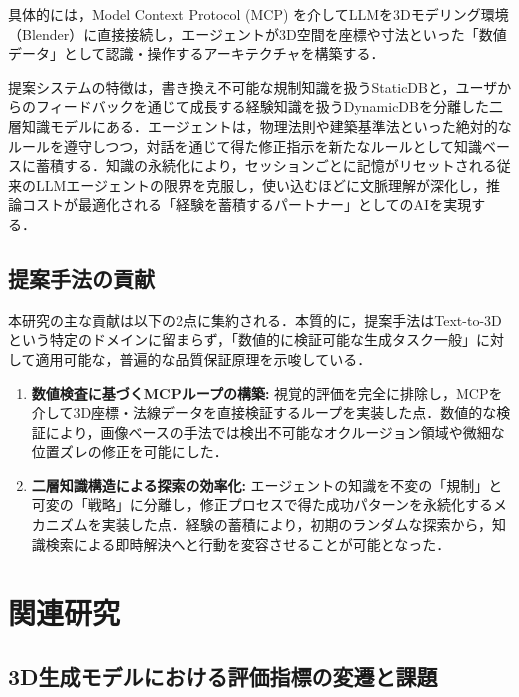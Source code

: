 \documentclass[dvipdfmx, a4paper, 9pt]{deimj}
\begin{document}
具体的には，Model Context Protocol (MCP)\cite{anthropic2024mcp} を介してLLMを3Dモデリング環境（Blender）に直接接続し，エージェントが3D空間を座標や寸法といった「数値データ」として認識・操作するアーキテクチャを構築する．

提案システムの特徴は，書き換え不可能な規制知識を扱うStaticDBと，ユーザからのフィードバックを通じて成長する経験知識を扱うDynamicDBを分離した二層知識モデルにある．エージェントは，物理法則や建築基準法といった絶対的なルールを遵守しつつ，対話を通じて得た修正指示を新たなルールとして知識ベースに蓄積する．知識の永続化により，セッションごとに記憶がリセットされる従来のLLMエージェントの限界を克服し，使い込むほどに文脈理解が深化し，推論コストが最適化される「経験を蓄積するパートナー」としてのAIを実現する．

\subsection{提案手法の貢献}

本研究の主な貢献は以下の2点に集約される．本質的に，提案手法はText-to-3Dという特定のドメインに留まらず，「数値的に検証可能な生成タスク一般」に対して適用可能な，普遍的な品質保証原理を示唆している．
\begin{enumerate}
    \item \textbf{数値検査に基づくMCPループの構築:} 
    視覚的評価を完全に排除し，MCPを介して3D座標・法線データを直接検証するループを実装した点．数値的な検証により，画像ベースの手法では検出不可能なオクルージョン領域や微細な位置ズレの修正を可能にした．
    \item \textbf{二層知識構造による探索の効率化:} 
    エージェントの知識を不変の「規制」と可変の「戦略」に分離し，修正プロセスで得た成功パターンを永続化するメカニズムを実装した点．経験の蓄積により，初期のランダムな探索から，知識検索による即時解決へと行動を変容させることが可能となった．
\end{enumerate}

\section{関連研究}

\subsection{3D生成モデルにおける評価指標の変遷と課題}
\end{document}

